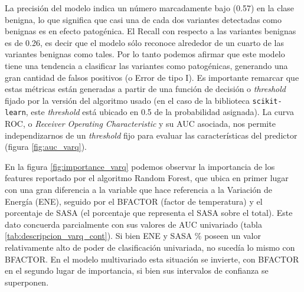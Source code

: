 La precisión del modelo indica un número marcadamente bajo (0.57) en la clase benigna, lo que significa que casi una de cada dos variantes detectadas como benignas es en efecto patogénica. El Recall con respecto a las variantes benignas es de 0.26, es decir que el modelo sólo reconoce alrededor de un cuarto de las variantes benignas como tales. Por lo tanto podemos afirmar que este modelo tiene una tendencia a clasificar las variantes como patogénicas, generando una gran cantidad de falsos positivos (o Error de tipo I). Es importante remarcar que estas métricas están generadas a partir de una función de decisión o \textit{threshold} fijado por la versión del algoritmo usado (en el caso de la biblioteca \texttt{scikit-learn}, este \textit{threshold} está ubicado en 0.5 de la probabilidad asignada).  La curva ROC, o \textit{Receiver Operating Characteristic} y su AUC asociada, nos permite independizarnos de un \textit{threshold} fijo para evaluar las características del predictor (figura \ref{fig:auc_varq}).

En la figura \ref{fig:importance_varq} podemos observar la importancia de los features reportado por el algoritmo Random Forest, que ubica en primer lugar con una gran diferencia a la variable que hace referencia a la Variación de Energía (ENE), seguido por el BFACTOR (factor de temperatura) y el porcentaje de SASA (el porcentaje que representa el SASA sobre el total). Este dato concuerda parcialmente con sus valores de AUC univariado (tabla \ref{tab:descripcion_varq_cont}). Si bien ENE y SASA \% poseen un valor relativamente alto de poder de clasificación univariada, no sucedía lo mismo con BFACTOR. En el modelo multivariado esta situación se invierte, con BFACTOR en el segundo lugar de importancia, si bien sus intervalos de confianza se superponen.

\newpage


